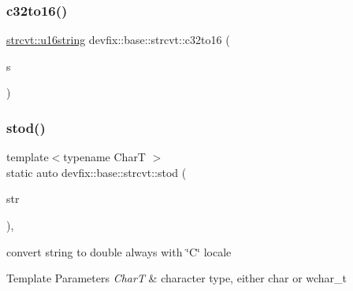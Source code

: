 \mbox{\label{structdevfix_1_1base_1_1strcvt_aa174cae3c3c133848799549be4b0cb16}} 
\subsubsection{\texorpdfstring{c32to16()}{c32to16()}}
{\footnotesize\ttfamily \hyperlink{structdevfix_1_1base_1_1strcvt_a33a324a669607cdb717d84bbfa1f844b}{strcvt\+::u16string} devfix\+::base\+::strcvt\+::c32to16 (\begin{DoxyParamCaption}\item[{const \hyperlink{structdevfix_1_1base_1_1strcvt_a34f169167c3c7c1315df2eca9d5532d7}{u32string} \&}]{s }\end{DoxyParamCaption})\hspace{0.3cm}{\ttfamily [static]}}

\mbox{\label{structdevfix_1_1base_1_1strcvt_a63350be05c30f4cffee9d8dc8eed54d5}} 
\subsubsection{\texorpdfstring{stod()}{stod()}\hspace{0.1cm}{\footnotesize\ttfamily [1/2]}}
{\footnotesize\ttfamily template$<$typename CharT $>$ \\
static auto devfix\+::base\+::strcvt\+::stod (\begin{DoxyParamCaption}\item[{const std\+::basic\+\_\+string$<$ CharT $>$ \&}]{str }\end{DoxyParamCaption})\hspace{0.3cm}{\ttfamily [inline]}, {\ttfamily [static]}}



convert string to double always with \char`\"{}\+C\char`\"{} locale 


\begin{DoxyTemplParams}{Template Parameters}
{\em CharT} & character type, either \textquotesingle{}char\textquotesingle{} or \textquotesingle{}wchar\+\_\+t\textquotesingle{} \\
\hline
\end{DoxyTemplParams}

